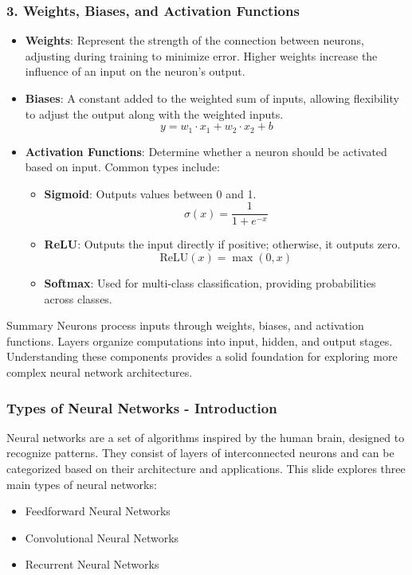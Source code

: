 \documentclass[aspectratio=169]{beamer}
\begin{document}
\begin{frame}[fragile]
  \frametitle{3. Weights, Biases, and Activation Functions}
  \begin{itemize}
    \item \textbf{Weights}: Represent the strength of the connection between neurons, adjusting during training to minimize error. Higher weights increase the influence of an input on the neuron's output.
    
    \item \textbf{Biases}: A constant added to the weighted sum of inputs, allowing flexibility to adjust the output along with the weighted inputs.
    \begin{equation}
      y = w_1 \cdot x_1 + w_2 \cdot x_2 + b
    \end{equation}
    
    \item \textbf{Activation Functions}: Determine whether a neuron should be activated based on input. Common types include:
    \begin{itemize}
      \item \textbf{Sigmoid}: Outputs values between 0 and 1.
      \begin{equation}
        \sigma(x) = \frac{1}{1 + e^{-x}}
      \end{equation}
      \item \textbf{ReLU}: Outputs the input directly if positive; otherwise, it outputs zero.
      \begin{equation}
        \text{ReLU}(x) = \max(0, x)
      \end{equation}
      \item \textbf{Softmax}: Used for multi-class classification, providing probabilities across classes.
    \end{itemize}
  \end{itemize}
  
  \begin{block}{Summary}
    Neurons process inputs through weights, biases, and activation functions. Layers organize computations into input, hidden, and output stages. Understanding these components provides a solid foundation for exploring more complex neural network architectures.
  \end{block}
\end{frame}

\begin{frame}[fragile]
    \frametitle{Types of Neural Networks - Introduction}
    Neural networks are a set of algorithms inspired by the human brain, designed to recognize patterns. 
    They consist of layers of interconnected neurons and can be categorized based on their architecture and applications. 
    This slide explores three main types of neural networks:
    \begin{itemize}
        \item Feedforward Neural Networks
        \item Convolutional Neural Networks
        \item Recurrent Neural Networks
    \end{itemize}
\end{frame}
\end{document}
